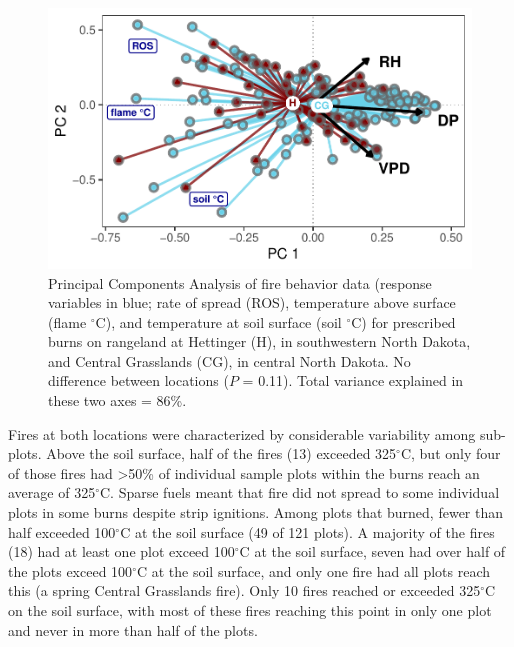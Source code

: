 \documentclass[referee, 
		     sn-basic]{sn-jnl}
\newcommand{\degC}{$^\circ$C}
\begin{document}
\begin{linenumbers}
\begin{figure} 
\includegraphics[width = 1\columnwidth]{pca_gg-1.pdf}
\caption{Principal Components Analysis of fire behavior data (response
variables in blue; rate of spread (ROS), temperature above surface
(flame \degC), and temperature at soil surface (soil \degC) for prescribed
burns on rangeland at Hettinger (H), in southwestern North Dakota, and
Central Grasslands (CG), in central North Dakota. No difference between
locations ($P$ = 0.11). 
Total variance explained in these two axes = 86\%.}
\label{PCA}
\end{figure}

Fires at both locations were characterized by considerable variability
among sub-plots. Above the soil surface, half of the fires (13) exceeded
325\(^\circ\)C, but only four of those fires had \textgreater50\% of
individual sample plots within the burns reach an average of
325\(^\circ\)C. Sparse fuels meant that fire did not spread to some
individual plots in some burns despite strip ignitions. Among plots that
burned, fewer than half exceeded 100\(^\circ\)C at the soil surface (49
of 121 plots). A majority of the fires (18) had at least one plot exceed
100\(^\circ\)C at the soil surface, seven had over half of the plots
exceed 100\(^\circ\)C at the soil surface, and only one fire had all
plots reach this (a spring Central Grasslands fire). Only 10 fires
reached or exceeded 325\(^\circ\)C on the soil surface, with most of
these fires reaching this point in only one plot and never in more than
half of the plots.


\end{linenumbers}
\end{document}
